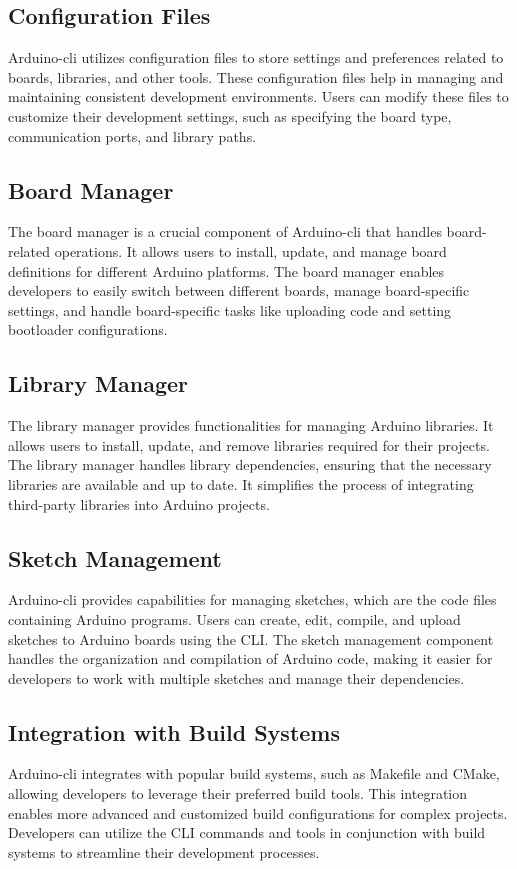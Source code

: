 \documentclass[a4paper, 11pt]{article}
\begin{document}
\subsection{Configuration Files}
Arduino-cli utilizes configuration files to store settings and preferences related to boards, libraries, and other tools. These configuration files help in managing and maintaining consistent development environments. Users can modify these files to customize their development settings, such as specifying the board type, communication ports, and library paths.
\subsection{Board Manager}
The board manager is a crucial component of Arduino-cli that handles board-related operations. It allows users to install, update, and manage board definitions for different Arduino platforms. The board manager enables developers to easily switch between different boards, manage board-specific settings, and handle board-specific tasks like uploading code and setting bootloader configurations.
\subsection{Library Manager}
The library manager provides functionalities for managing Arduino libraries. It allows users to install, update, and remove libraries required for their projects. The library manager handles library dependencies, ensuring that the necessary libraries are available and up to date. It simplifies the process of integrating third-party libraries into Arduino projects.
\subsection{Sketch Management}
Arduino-cli provides capabilities for managing sketches, which are the code files containing Arduino programs. Users can create, edit, compile, and upload sketches to Arduino boards using the CLI. The sketch management component handles the organization and compilation of Arduino code, making it easier for developers to work with multiple sketches and manage their dependencies.
\subsection{Integration with Build Systems}
Arduino-cli integrates with popular build systems, such as Makefile and CMake, allowing developers to leverage their preferred build tools. This integration enables more advanced and customized build configurations for complex projects. Developers can utilize the CLI commands and tools in conjunction with build systems to streamline their development processes.
\end{document}
